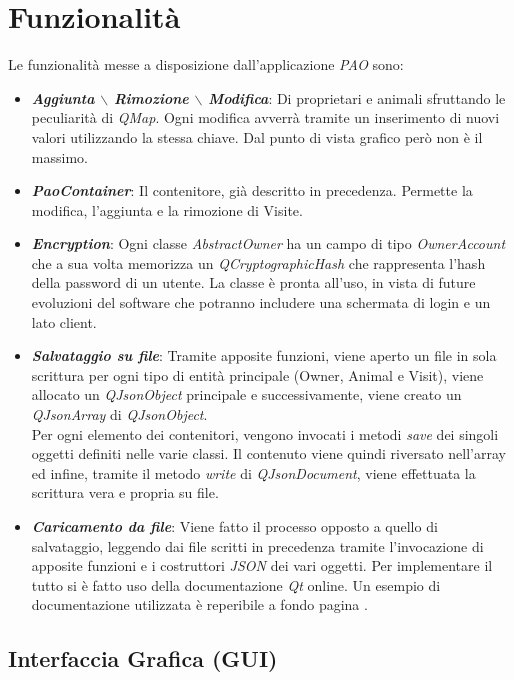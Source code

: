\chapter{Funzionalità} 

Le funzionalità messe a disposizione dall'applicazione \textit{PAO} sono:

\begin{itemize}
	\item \textit{\textbf{Aggiunta $\backslash$ Rimozione $\backslash$ Modifica}}: Di proprietari e animali sfruttando le peculiarità di \textit{QMap}. Ogni modifica avverrà tramite un inserimento di nuovi valori utilizzando la stessa chiave. Dal punto di vista grafico però non è il massimo.
	\item \textit{\textbf{PaoContainer}}: Il contenitore, già descritto in precedenza. Permette la modifica, l'aggiunta e la rimozione di Visite.
	\item \textit{\textbf{Encryption}}: Ogni classe \textit{AbstractOwner} ha un campo di tipo \textit{OwnerAccount} che a sua volta memorizza un \textit{QCryptographicHash} che rappresenta l'hash della password di un utente. La classe è pronta all'uso, in vista di future evoluzioni del software che potranno includere una schermata di login e un lato client.
	\item \textit{\textbf{Salvataggio su file}}: Tramite apposite funzioni, viene aperto un file in sola scrittura per ogni tipo di entità principale (Owner, Animal e Visit), viene allocato un \textit{QJsonObject} principale e successivamente, viene creato un \textit{QJsonArray} di \textit{QJsonObject}. \\ Per ogni elemento dei contenitori, vengono invocati i metodi \textit{save} dei singoli oggetti definiti nelle varie classi. Il contenuto viene quindi riversato nell'array ed infine, tramite il metodo \textit{write} di \textit{QJsonDocument}, viene effettuata la scrittura vera e propria su file.  
	\item \textit{\textbf{Caricamento da file}}: Viene fatto il processo opposto a quello di salvataggio, leggendo dai file scritti in precedenza tramite l'invocazione di apposite funzioni e i costruttori \textit{JSON} dei vari oggetti. Per implementare il tutto si è fatto uso della documentazione \textit{Qt} online. Un esempio di documentazione utilizzata è reperibile a fondo pagina .
\end{itemize} 

\section{Interfaccia Grafica (GUI)}

